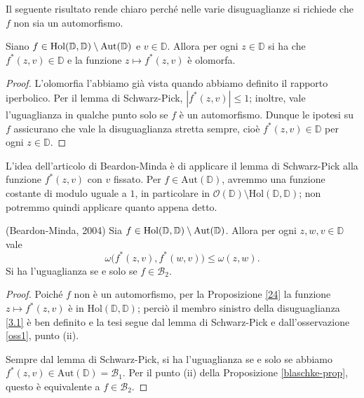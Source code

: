 Il seguente risultato rende chiaro perché nelle varie disuguaglianze si richiede che $f$ non sia un automorfismo.

\begin{prop} \label{24}
  Siano $f \in \text{\normalfont{Hol}}(\mathbb{D},\mathbb{D})\setminus\text{\normalfont{Aut}}(\mathbb{D})$ e $v \in \mathbb{D}$. Allora per ogni $z \in \mathbb{D}$ si ha che $f^*(z,v) \in \mathbb{D}$ e la funzione $z \longmapsto f^*(z,v)$ è olomorfa.
\end{prop}

\begin{proof}
  L'olomorfia l'abbiamo già vista quando abbiamo definito il rapporto iperbolico. Per il lemma di Schwarz-Pick, $|f^*(z,v)| \le 1$; inoltre, vale l'uguaglianza in qualche punto solo se $f$ è un automorfismo. Dunque le ipotesi su $f$ assicurano che vale la disuguaglianza stretta sempre, cioè $f^*(z,v) \in \mathbb{D}$ per ogni $z \in \mathbb{D}$.
\end{proof}

L'idea dell'articolo di Beardon-Minda è di applicare il lemma di Schwarz-Pick alla funzione $f^*(z,v)$ con $v$ fissato. Per $f \in \text{Aut}(\mathbb{D})$, avremmo una funzione costante di modulo uguale a $1$, in particolare in $\mathcal{O}(\mathbb{D})\setminus\text{Hol}(\mathbb{D},\mathbb{D})$; non potremmo quindi applicare quanto appena detto.

\begin{thm} \label{31}
  (Beardon-Minda, 2004) Sia $f \in \text{\normalfont{Hol}}(\mathbb{D},\mathbb{D})\setminus\text{\normalfont{Aut}}(\mathbb{D})$. Allora per ogni $z, w, v \in \mathbb{D}$ vale
  \begin{equation} \label{3.1}
    \omega\bigl(f^*(z,v),f^*(w,v)\bigr) \le \omega(z,w).
  \end{equation}
  Si ha l'uguaglianza se e solo se $f \in \mathcal{B}_2$.
\end{thm}

\begin{proof}
  Poiché $f$ non è un automorfismo, per la Proposizione \ref{24} la funzione $z \longmapsto f^*(z,v)$ è in $\text{Hol}(\mathbb{D}, \mathbb{D})$; perciò il membro sinistro della disuguaglianza \eqref{3.1} è ben definito e la tesi segue dal lemma di Schwarz-Pick e dall'osservazione \ref{oss1}, punto (ii).

  Sempre dal lemma di Schwarz-Pick, si ha l'uguaglianza se e solo se abbiamo $f^*(z,v) \in \text{Aut}(\mathbb{D})=\mathcal{B}_1$. Per il punto (ii) della Proposizione \ref{blaschke-prop}, questo è equivalente a $f \in \mathcal{B}_2$.
\end{proof}

